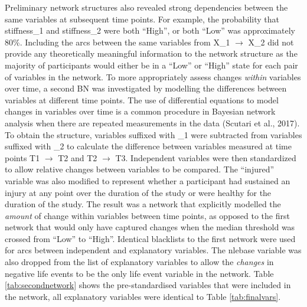 \documentclass[man,floatsintext]{apa6}
\begin{document}
Preliminary network structures also revealed strong dependencies between the same variables at subsequent time points.
For example, the probability that stiffness\_1 and stiffness\_2 were both \enquote{High}, or both \enquote{Low} was approximately 80\%.
Including the arcs between the same variables from X\_1 \(\rightarrow\) X\_2 did not provide any theoretically meaningful information to the network structure as the majority of participants would either be in a \enquote{Low} or \enquote{High} state for each pair of variables in the network.
To more appropriately assess changes \emph{within} variables over time, a second BN was investigated by modelling the differences between variables at different time points.
The use of differential equations to model changes in variables over time is a common procedure in Bayesian network analysis when there are repeated measurements in the data (Scutari et al., 2017).
To obtain the structure, variables suffixed with \_1 were subtracted from variables suffixed with \_2 to calculate the difference between variables measured at time points T1 \(\rightarrow\) T2 and T2 \(\rightarrow\) T3.
Independent variables were then standardized to allow relative changes between variables to be compared.
The \enquote{injured} variable was also modified to represent whether a participant had sustained an injury at any point over the duration of the study or were healthy for the duration of the study.
The result was a network that explicitly modelled the \emph{amount} of change within variables between time points, as opposed to the first network that would only have captured changes when the median threshold was crossed from \enquote{Low} to \enquote{High}.
Identical blacklists to the first network were used for arcs between independent and explanatory variables.
The nlebase variable was also dropped from the list of explanatory variables to allow the \emph{changes} in negative life events to be the only life event variable in the network.
Table \ref{tab:secondnetwork} shows the pre-standardised variables that were included in the network, all explanatory variables were identical to Table \ref{tab:finalvars}.
\end{document}
